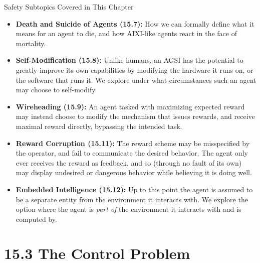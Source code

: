 \documentclass[aspectratio=169,10pt]{beamer}
\begin{document}
\begin{frame}[allowframebreaks]{Safety Subtopics Covered in This Chapter}
  \begin{itemize}
    \item \textbf{Death and Suicide of Agents (15.7):} How we can formally
      define what it means for an agent to die, and how AIXI-like agents
      react in the face of mortality.
    \item \textbf{Self-Modification (15.8):} Unlike humans, an AGSI has
      the potential to greatly improve its own capabilities by modifying
      the hardware it runs on, or the software that runs it. We explore
      under what circumstances such an agent may choose to self-modify.
    \item \textbf{Wireheading (15.9):} An agent tasked with maximizing
      expected reward may instead choose to modify the mechanism that
      issues rewards, and receive maximal reward directly, bypassing the
      intended task.
    \item \textbf{Reward Corruption (15.11):} The reward scheme may be
      misspecified by the operator, and fail to communicate the desired
      behavior. The agent only ever receives the reward as feedback, and
      so (through no fault of its own) may display undesired or dangerous
      behavior while believing it is doing well.
    \item \textbf{Embedded Intelligence (15.12):} Up to this point the
      agent is assumed to be a separate entity from the environment it
      interacts with. We explore the option where the agent is
      \emph{part of} the environment it interacts with and is computed by.
  \end{itemize}
\end{frame}

\section{15.3 The Control Problem}
\end{document}
